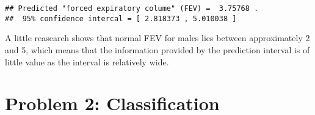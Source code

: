 \documentclass[]{article}
\newenvironment{Shaded}{\begin{snugshade}}{\end{snugshade}}
\newcommand{\KeywordTok}[1]{\textcolor[rgb]{0.13,0.29,0.53}{\textbf{#1}}}
\newcommand{\DataTypeTok}[1]{\textcolor[rgb]{0.13,0.29,0.53}{#1}}
\newcommand{\DecValTok}[1]{\textcolor[rgb]{0.00,0.00,0.81}{#1}}
\newcommand{\FloatTok}[1]{\textcolor[rgb]{0.00,0.00,0.81}{#1}}
\newcommand{\CharTok}[1]{\textcolor[rgb]{0.31,0.60,0.02}{#1}}
\newcommand{\StringTok}[1]{\textcolor[rgb]{0.31,0.60,0.02}{#1}}
\newcommand{\NormalTok}[1]{#1}
\begin{document}
\begin{Shaded}
\end{Shaded}

\begin{verbatim}
## Predicted "forced expiratory colume" (FEV) =  3.75768 . 
##  95% confidence intercal = [ 2.818373 , 5.010038 ]
\end{verbatim}

A little reasearch shows that normal FEV for males lies between
approximately 2 and 5, which means that the information provided by the
prediction interval is of little value as the interval is relatively
wide.

\section{Problem 2: Classification}\label{problem-2-classification}
\end{document}
